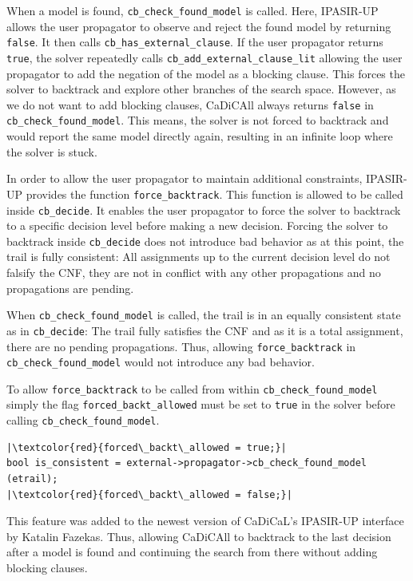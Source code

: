 \documentclass[12pt,a4paper]{article}
\begin{document}
When a model is found, \verb|cb_check_found_model| is called. Here, IPASIR-UP allows the user propagator to observe and reject the found model by returning \verb|false|. It then calls \verb|cb_has_external_clause|. If the user propagator returns \verb|true|, the solver repeatedly calls \verb|cb_add_external_clause_lit| allowing the user propagator to add the negation of the model as a blocking clause. This forces the solver to backtrack and explore other branches of the search space. However, as we do not want to add blocking clauses, CaDiCAll always returns \verb|false| in \verb|cb_check_found_model|. This means, the solver is not forced to backtrack and would report the same model directly again, resulting in an infinite loop where the solver is stuck.

In order to allow the user propagator to maintain additional constraints, IPASIR-UP provides the function \verb|force_backtrack|. This function is allowed to be called inside \verb|cb_decide|. It enables the user propagator to force the solver to backtrack to a specific decision level before making a new decision. Forcing the solver to backtrack inside \verb|cb_decide| does not introduce bad behavior as at this point, the trail is fully consistent: All assignments up to the current decision level do not falsify the CNF, they are not in conflict with any other propagations and no propagations are pending.

When \verb|cb_check_found_model| is called, the trail is in an equally consistent state as in \verb|cb_decide|: The trail fully satisfies the CNF and as it is a total assignment, there are no pending propagations. Thus, allowing \verb|force_backtrack| in \verb|cb_check_found_model| would not introduce any bad behavior.

To allow \verb|force_backtrack| to be called from within \verb|cb_check_found_model| simply the flag \verb|forced_backt_allowed| must be set to \verb|true| in the solver before calling \verb|cb_check_found_model|.

\begin{verbatim}
|\textcolor{red}{forced\_backt\_allowed = true;}|
bool is_consistent = external->propagator->cb_check_found_model (etrail);
|\textcolor{red}{forced\_backt\_allowed = false;}|
\end{verbatim}

This feature was added to the newest version of CaDiCaL's IPASIR-UP interface by Katalin Fazekas. Thus, allowing CaDiCAll to backtrack to the last decision after a model is found and continuing the search from there without adding blocking clauses.
\end{document}
